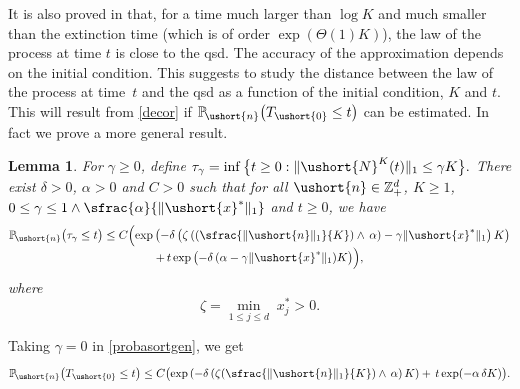 \documentclass[JEP,XML,SOM,Unicode]{cedram}
\newcommand{\Psfrac}[2]{(\sfrac{#1}{#2})}
\numberwithin{equation}{section}
\theoremstyle{plain}
\newtheorem{lemma}[theorem]{Lemma}
\theoremstyle{definition}
\newcommand{\proba}{{\mathbb{P}}}
\newcommand{\zentiers}{{\mathbb{Z}}}
\newcommand{\domaine}{\zentiers_{+}^{d}}
\newcommand{\Thetaun}{\Theta(1)}
\newcommand{\vecn}{\ushort{n}}
\newcommand{\vecxf}{\ushort{x}^*}
\newcommand{\veczer}{\ushort{0}}
\newcommand{\leproc}{\ushort{N}^{K}}
\newcommand{\norm}[1]{\|#1\|_{1}}\let\snorm\norm
\begin{document}
It is also proved in \cite{ccm2} that, for a time much larger than $\log K$ and much smaller than the extinction time
(which is of order $\exp(\Thetaun K)$), the law of the process at time $t$ is close to the qsd. The accuracy of the
approximation depends on the initial condition. This suggests to study the distance between the law of the process at time~$t$ and
the qsd as a function of the initial condition, $K$ and $t$.
This will result from \eqref{decor} if $\proba_{\!\vecn}\bigl(T_{\veczer}\leq t\bigr)$ can be estimated. In fact we prove a more general
result.

\begin{lemma}\label{sortpas}
For $\gamma\geq 0$, define $\tau_{\gamma}=\inf\big\{t\geq 0:\| \leproc(t)\|_1\le \gamma K\big\}.$
There exist $\delta>0$, $\alpha>0$ and $C>0$ such that for all $\vecn\in\domaine$, $K\ge 1$,
$0\le \gamma\le 1\wedge \sfrac{\alpha}{\snorm{\vecxf}}$ and $t\ge0$, we have
\begin{multline}\label{probasortgen}
\proba_{\!\vecn}\bigl(\tau_{\gamma}\leq t\bigr)
\leq C\Bigl(\exp\left(-\delta\left(\zeta\left(\Psfrac{\norm{\vecn}}{K}\wedge\,\alpha\right)-\gamma \norm{\vecxf}\right)K\right)\\[-3pt]
+\, t \exp\left(-\delta\,(\alpha-\gamma \norm{\vecxf}) K\right)\Bigr),
\end{multline}
where
\begin{equation}\label{def-zeta}
\zeta=\min_{1\le j\le d}\;x^*_{j}>0.
\end{equation}
\end{lemma}
Taking $\gamma=0$ in \eqref{probasortgen}, we get
\begin{equation}\label{probasort}
\proba_{\!\vecn}\bigl(T_{\veczer}\leq t\bigr)
\leq C\bigl(\exp\left(-\delta\left(\zeta\Psfrac{\snorm{\vecn}}{K}\wedge\,\alpha\right)K\right)+\, t \exp(-\alpha\,\delta K)\bigr).
\end{equation}
\end{document}
